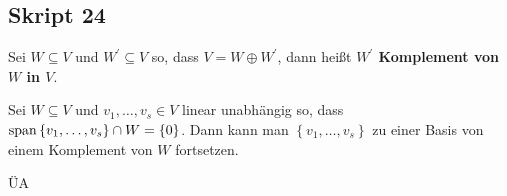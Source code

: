 \subsection{Skript 24}
\setcounter{subenvironmentnumber}{-1}

\begin{subnote}[Erinnerung]
	Sei $ W \subseteq V $ und $ W^\prime \subseteq V $ so, dass $ V = W \oplus W^\prime  $, dann heißt \textbf{$ W^\prime  $ Komplement von $ W $ in $ V $}.
\end{subnote}

\begin{subnote}[Bemerkung]
	Sei $ W \subseteq V $ und $ v_1, \dotsc, v_s \in V $ linear unabhängig so, dass $ \operatorname{span} \left\{ v_1, \dotsc, v_s \right\} \cap W = \left\{ 0 \right\}  $.
	Dann kann man $ \left\{ v_1, \dotsc, v_s \right\}  $ zu einer Basis von einem Komplement von $ W $ fortsetzen.
\end{subnote}
\begin{subproof*}
	ÜA
\end{subproof*}

